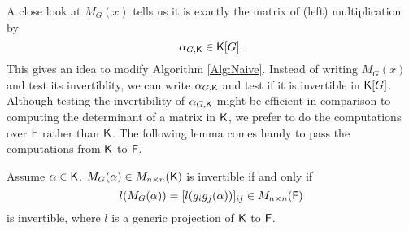  A close look at $M_G(x)$ tells us it is exactly the matrix of (left) multiplication by $$\alpha_{G,{\mathsf{K}}} \in {\mathsf{K}}[G].$$  This gives an idea to modify Algorithm \ref{Alg:Naive}. Instead of writing $M_G(x)$ and test its  invertiblity, 
 we can write $\alpha_{G,{\mathsf{K}}}$ and test if it is invertible in ${\mathsf{K}}[G]$. Although testing the invertibility of $\alpha_{G,{\mathsf{K}}}$ might be efficient in
 comparison to computing the determinant of a matrix in ${\mathsf{K}}$, we prefer to do the computations over ${\mathsf{F}}$ rather than ${\mathsf{K}}$. The  following lemma
 comes handy to pass the computations from ${\mathsf{K}}$ to ${\mathsf{F}}$.


\begin{lemma}\label{Lem:Proj}
Assume $\alpha \in {\mathsf{K}}$. $M_G(\alpha) \in M_{n \times n}({\mathsf{K}})$ 
is invertible if and only if $$l(M_G(\alpha)) =  [l(g_ig_j(\alpha))]_{ij}  \in M_{n \times n}({\mathsf{F}})$$ is invertible,
 where $l$ is a generic projection of ${\mathsf{K}}$ to ${\mathsf{F}}$.
\end{lemma}

